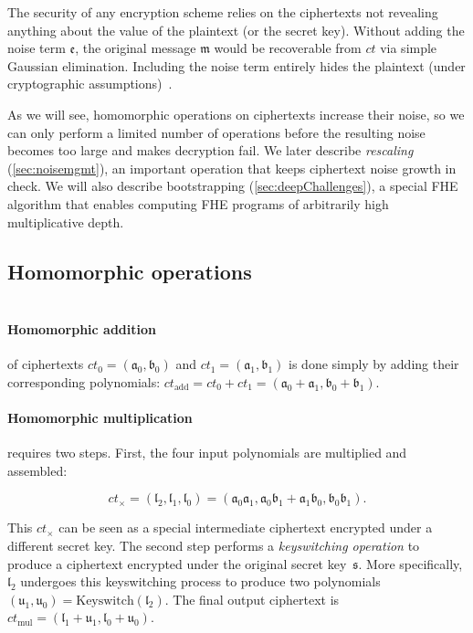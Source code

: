 The security of any encryption scheme relies on the ciphertexts not revealing
anything about the value of the plaintext (or the secret key). Without adding
the noise term $\mathfrak{e}$, the original message $\mathfrak{m}$ would be
recoverable from $ct$ via simple Gaussian elimination. Including the noise term
entirely hides the plaintext (under cryptographic
assumptions)~\cite{lyubashevsky:tact10:ideal}.

As we will see, homomorphic operations on ciphertexts increase their noise, so
we can only perform a limited number of operations before the resulting noise
becomes too large and makes decryption fail.  We later describe
\emph{rescaling} (\autoref{sec:noisemgmt}), an important operation that keeps
ciphertext noise growth in check. We will also describe bootstrapping
(\autoref{sec:deepChallenges}), a special FHE algorithm that enables computing
FHE programs of arbitrarily high multiplicative depth.

\subsection{Homomorphic operations}

\paragraph{\\Homomorphic addition} of ciphertexts
$ct_0 = (\mathfrak{a}_{0}, \mathfrak{b}_{0})$ and
$ct_1 = (\mathfrak{a}_{1}, \mathfrak{b}_{1})$ is done simply by adding
their corresponding polynomials:
$ct_{\text{add}} = ct_0 + ct_1 = (\mathfrak{a}_0 + \mathfrak{a}_1,
\mathfrak{b}_0 + \mathfrak{b}_1)$.

\paragraph{Homomorphic multiplication} requires two steps.
First, the four input polynomials are multiplied and assembled:

\begin{equation*}
  ct_{\times} = (\mathfrak{l}_2, \mathfrak{l}_1, \mathfrak{l}_0) = (\mathfrak{a}_0\mathfrak{a}_1,
  \mathfrak{a}_0\mathfrak{b}_1 + \mathfrak{a}_1 \mathfrak{b}_0,
  \mathfrak{b}_0\mathfrak{b}_1) .
\end{equation*}

This $ct_{\times}$ can be seen as a special intermediate ciphertext encrypted
under a different secret key. The second step performs a \emph{keyswitch\-ing
op\-era\-tion} to produce a ciphertext encrypted under the original secret
key~$\mathfrak{s}$. More specifically, $\mathfrak{l}_2$ undergoes this
keyswitching process to produce two polynomials $(\mathfrak{u}_1,
\mathfrak{u}_0) = \textrm{Keyswitch}(\mathfrak{l}_2)$.  The final output
ciphertext is $ct_{\text{mul}} = (\mathfrak{l}_1 + \mathfrak{u}_1,
\mathfrak{l}_0 + \mathfrak{u}_0)$.

